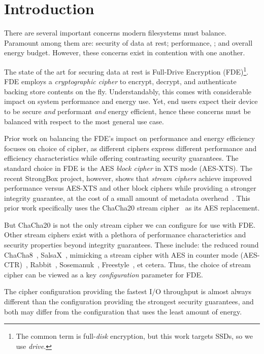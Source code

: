 \section{Introduction}\label{sec:introduction}

There are several important concerns modern filesystems must balance. Paramount
among them are: security of data at rest; performance, ; and overall energy budget. However, these concerns exist in
contention with one another.

The state of the art for securing data at rest is Full-Drive Encryption
(FDE)\footnote{The common term is full-\emph{disk} encryption, but this work
targets SSDs, so we use \emph{drive}.}. FDE employs a \emph{cryptographic
cipher} to encrypt, decrypt, and authenticate backing store contents on the fly.
Understandably, this comes with considerable impact on system performance and
energy use.  Yet, end users expect their device to be secure
\emph{and} performant \emph{and} energy efficient, hence these concerns must be
balanced with respect to the most general use case.

Prior work on balancing the FDE's impact on performance and energy efficiency
focuses on choice of cipher, as different ciphers express different performance
and efficiency characteristics while offering contrasting security guarantees.
The standard choice in FDE is the AES \emph{block cipher} in XTS mode (AES-XTS).
The recent StrongBox project, however, shows that \emph{stream ciphers} achieve
improved performance versus AES-XTS and other block ciphers while providing a
stronger integrity guarantee, at the cost of a small amount of metadata
overhead~\cite{StrongBox}. This prior work specifically uses the ChaCha20 stream
cipher~\cite{ChaCha20} as its AES replacement.

But ChaCha20 is not the only stream cipher we can configure for use with FDE.
Other stream ciphers exist with a plethora of performance characteristics and
security properties beyond integrity guarantees. These include: the reduced
round ChaCha8~\cite{ChaCha8}, SalsaX~\cite{SalsaX}, mimicking a stream cipher
with AES in counter mode (AES-CTR)~\cite{AES-CTR}, Rabbit~\cite{Rabbit},
Sosemanuk~\cite{Sosemanuk}, Freestyle~\cite{Freestyle}, et cetera. Thus, the
choice of stream cipher can be viewed as a key \emph{configuration} parameter
for FDE.

The cipher configuration providing the fastest I/O throughput is almost always
different than the configuration providing the strongest security guarantees,
and both may differ from the configuration that uses the least amount of energy.

